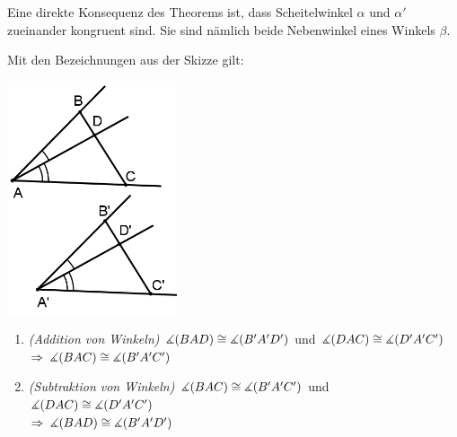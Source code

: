 Eine direkte Konsequenz des Theorems ist, dass Scheitelwinkel $\alpha$ und $\alpha'$ zueinander
kongruent sind. Sie sind nämlich beide Nebenwinkel eines Winkels $\beta$.

\begin{thm}\label{thm:satz.s1l}
    Mit den Bezeichnungen aus der Skizze gilt:


    \centerline{\includegraphics[width=5cm]{BILDER/1-2-15b-Winkel.png}}

    \renewcommand{\labelenumi}{\alph{enumi})} %
    \begin{enumerate}
        \item\label{thm:satz.s1l:item1} \emph{(Addition von Winkeln)} $\mbox{$\measuredangle$}(BAD) \cong \mbox{$\measuredangle$}(B'A'D')$
            und $\mbox{$\measuredangle$}(DAC) \cong \mbox{$\measuredangle$}(D'A'C')$\\ $\Rightarrow\;\mbox{$\measuredangle$}(BAC) \cong \mbox{$\measuredangle$}(B'A'C')$

        \item\label{thm:satz.s1l:item2} \emph{(Subtraktion von Winkeln)} $\mbox{$\measuredangle$}(BAC) \cong
            \mbox{$\measuredangle$}(B'A'C')$ und $\mbox{$\measuredangle$}(DAC) \cong \mbox{$\measuredangle$}(D'A'C')$\\
            $\Rightarrow\; \mbox{$\measuredangle$}(BAD) \cong \mbox{$\measuredangle$}(B'A'D')$
    \end{enumerate}
\end{thm}

